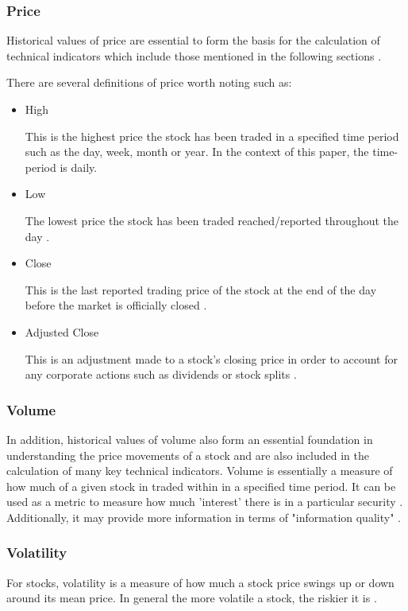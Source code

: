 \subsubsection{Price}
\label{subsubsection: Price Definitions}

Historical values of price are essential to form the basis for the calculation of   technical indicators which include those mentioned in the following sections \cite{tech_analysis}.

There are several definitions of price worth noting such as:

\begin{itemize}
    \item High 
    
    This is the highest price the stock has been traded in a specified time period such as the day, week, month or year. In the context of this paper, the time-period is daily. \cite{high}
    \item Low 
    
    The lowest price the stock has been traded reached/reported throughout the day \cite{high}.
    \item Close 
    
    This is the last reported trading price of the stock at the end of the day before the market is officially closed \cite{close}.
    \item Adjusted Close 
    
    This is an adjustment made to a stock's closing price in order to account for any corporate actions such as dividends or stock splits \cite{adj_close}. 
\end{itemize}


\subsubsection{Volume}
In addition, historical values of volume also form an essential foundation in understanding the price movements of a stock and are also included in the calculation of many key technical indicators. Volume is essentially a measure of how much of a given stock in traded within in a specified time period. It can be used as a metric to measure how much 'interest' there is in a particular security \cite{tech_analysis}. Additionally, it may provide more information in terms of "information quality" \cite{tech_analysis}.

\subsubsection{Volatility}
For stocks, volatility is a measure of how much a stock price  swings up or down around its mean price. In general the more volatile a stock, the riskier it is \cite{volatility}. 

